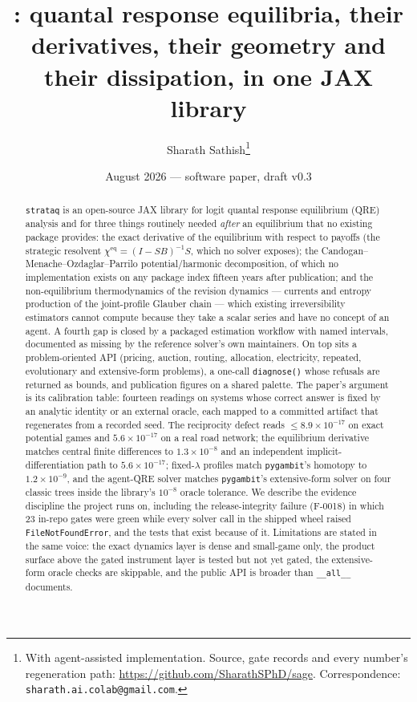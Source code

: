 \documentclass[11pt]{article}
\title{\textbf{\strataq: quantal response equilibria, their derivatives,
their geometry and their dissipation, in one JAX library}}
\author{Sharath Sathish\thanks{With agent-assisted implementation.
Source, gate records and every number's regeneration path:
\url{https://github.com/SharathSPhD/sage}. Correspondence:
\texttt{sharath.ai.colab@gmail.com}.}}
\date{August 2026 --- software paper, draft v0.3}
\newcommand{\chieq}{\chi^{\mathrm{eq}}}
\newcommand{\strataq}{\texttt{strataq}}
\begin{document}
\maketitle

\begin{abstract}
\noindent
\strataq{} is an open-source JAX library for logit quantal response equilibrium
(QRE) analysis and for three things routinely needed \emph{after} an equilibrium
that no existing package provides: the exact derivative of the equilibrium with
respect to payoffs (the strategic resolvent $\chieq=(I-SB)^{-1}S$, which no
solver exposes); the Candogan--Menache--Ozdaglar--Parrilo potential/harmonic
decomposition, of which no implementation exists on any package index fifteen
years after publication; and the non-equilibrium thermodynamics of the revision
dynamics --- currents and entropy production of the joint-profile Glauber chain
--- which existing irreversibility estimators cannot compute because they take a
scalar series and have no concept of an agent. A fourth gap is closed by a
packaged estimation workflow with named intervals, documented as missing by the
reference solver's own maintainers. On top sits a problem-oriented API (pricing,
auction, routing, allocation, electricity, repeated, evolutionary and
extensive-form problems), a one-call \texttt{diagnose()} whose refusals are
returned as bounds, and publication figures on a shared palette.
The paper's argument is its calibration table: fourteen readings on systems whose
correct answer is fixed by an analytic identity or an external oracle, each
mapped to a committed artifact that regenerates from a recorded seed. The
reciprocity defect reads $\le 8.9\times10^{-17}$ on exact potential games and
$5.6\times10^{-17}$ on a real road network; the equilibrium derivative matches
central finite differences to $1.3\times10^{-8}$ and an independent
implicit-differentiation path to $5.6\times10^{-17}$; fixed-$\lambda$ profiles
match \texttt{pygambit}'s homotopy to $1.2\times10^{-9}$, and the agent-QRE
solver matches \texttt{pygambit}'s extensive-form solver on four classic trees
inside the library's $10^{-8}$ oracle tolerance. We describe the evidence
discipline the project runs on, including the release-integrity failure (F-0018)
in which 23 in-repo gates were green while every solver call in the shipped wheel
raised \texttt{FileNotFoundError}, and the tests that exist because of it.
Limitations are stated in the same voice: the exact dynamics layer is dense and
small-game only, the product surface above the gated instrument layer is tested
but not yet gated, the extensive-form oracle checks are skippable, and the public
API is broader than \texttt{\_\_all\_\_} documents.
\end{abstract}
\end{document}
